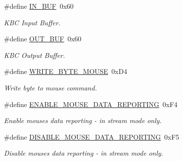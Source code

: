 \begin{DoxyCompactItemize}
\hypertarget{group__i8042_ga783be5698cf07b1daaf126ef89c19063}{}\label{group__i8042_ga783be5698cf07b1daaf126ef89c19063} 
\#define \hyperlink{group__i8042_ga783be5698cf07b1daaf126ef89c19063}{I\+N\+\_\+\+B\+UF}~0x60
\begin{DoxyCompactList}\small\item\em K\+BC Input Buffer. \end{DoxyCompactList}\item 
\hypertarget{group__i8042_gacfb42dde389e8ca36ab267002fbf5c6a}{}\label{group__i8042_gacfb42dde389e8ca36ab267002fbf5c6a} 
\#define \hyperlink{group__i8042_gacfb42dde389e8ca36ab267002fbf5c6a}{O\+U\+T\+\_\+\+B\+UF}~0x60
\begin{DoxyCompactList}\small\item\em K\+BC Output Buffer. \end{DoxyCompactList}\item 
\hypertarget{group__i8042_ga805da0759dba314e6339d8999c44824c}{}\label{group__i8042_ga805da0759dba314e6339d8999c44824c} 
\#define \hyperlink{group__i8042_ga805da0759dba314e6339d8999c44824c}{W\+R\+I\+T\+E\+\_\+\+B\+Y\+T\+E\+\_\+\+M\+O\+U\+SE}~0x\+D4
\begin{DoxyCompactList}\small\item\em Write byte to mouse command. \end{DoxyCompactList}\item 
\hypertarget{group__i8042_gaa5f3ea05c9f4c26b00c14a6a9a3b6ac7}{}\label{group__i8042_gaa5f3ea05c9f4c26b00c14a6a9a3b6ac7} 
\#define \hyperlink{group__i8042_gaa5f3ea05c9f4c26b00c14a6a9a3b6ac7}{E\+N\+A\+B\+L\+E\+\_\+\+M\+O\+U\+S\+E\+\_\+\+D\+A\+T\+A\+\_\+\+R\+E\+P\+O\+R\+T\+I\+NG}~0x\+F4
\begin{DoxyCompactList}\small\item\em Enable mouse\textquotesingle{}s data reporting -\/ in stream mode only. \end{DoxyCompactList}\item 
\hypertarget{group__i8042_ga9c5894f3db7aba4a1ec79e2a5696e579}{}\label{group__i8042_ga9c5894f3db7aba4a1ec79e2a5696e579} 
\#define \hyperlink{group__i8042_ga9c5894f3db7aba4a1ec79e2a5696e579}{D\+I\+S\+A\+B\+L\+E\+\_\+\+M\+O\+U\+S\+E\+\_\+\+D\+A\+T\+A\+\_\+\+R\+E\+P\+O\+R\+T\+I\+NG}~0x\+F5
\begin{DoxyCompactList}\small\item\em Disable mouse\textquotesingle{}s data reporting -\/ in stream mode only. \end{DoxyCompactList}\item 
\hypertarget{group__i8042_ga5add224b75509ea02834f2fe73c5636f}{}\label{group__i8042_ga5add224b75509ea02834f2fe73c5636f} 

\end{DoxyCompactItemize}
